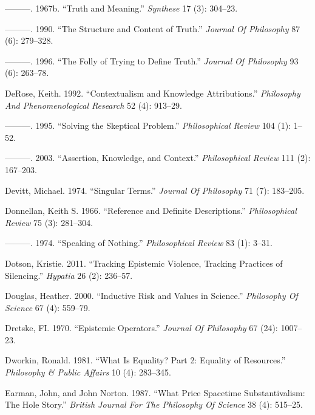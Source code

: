 \documentclass[
  10pt,
  letterpaper,
  DIV=11,
  numbers=noendperiod,
  twoside]{scrartcl}
\newlength{\cslhangindent}
\newenvironment{CSLReferences}[2] %
 {\begin{list}{}{%
  \setlength{\itemindent}{0pt}
  \setlength{\leftmargin}{0pt}
  \setlength{\parsep}{0pt}
  \ifodd #1
   \setlength{\leftmargin}{\cslhangindent}
   \setlength{\itemindent}{-1\cslhangindent}
  \fi
  \setlength{\itemsep}{#2\baselineskip}}}
 {\end{list}}
\begin{document}
\begin{CSLReferences}{1}{0}
---------. 1967b. {``Truth and Meaning.''} \emph{Synthese} 17 (3):
304--23.

---------. 1990. {``The Structure and Content of Truth.''} \emph{Journal
Of Philosophy} 87 (6): 279--328.

---------. 1996. {``The Folly of Trying to Define Truth.''}
\emph{Journal Of Philosophy} 93 (6): 263--78.

DeRose, Keith. 1992. {``Contextualism and Knowledge Attributions.''}
\emph{Philosophy And Phenomenological Research} 52 (4): 913--29.

---------. 1995. {``Solving the Skeptical Problem.''}
\emph{Philosophical Review} 104 (1): 1--52.

---------. 2003. {``Assertion, Knowledge, and Context.''}
\emph{Philosophical Review} 111 (2): 167--203.

Devitt, Michael. 1974. {``Singular Terms.''} \emph{Journal Of
Philosophy} 71 (7): 183--205.

Donnellan, Keith S. 1966. {``Reference and Definite Descriptions.''}
\emph{Philosophical Review} 75 (3): 281--304.

---------. 1974. {``Speaking of Nothing.''} \emph{Philosophical Review}
83 (1): 3--31.

Dotson, Kristie. 2011. {``Tracking Epistemic Violence, Tracking
Practices of Silencing.''} \emph{Hypatia} 26 (2): 236--57.

Douglas, Heather. 2000. {``Inductive Risk and Values in Science.''}
\emph{Philosophy Of Science} 67 (4): 559--79.

Dretske, FI. 1970. {``Epistemic Operators.''} \emph{Journal Of
Philosophy} 67 (24): 1007--23.

Dworkin, Ronald. 1981. {``What Is Equality? Part 2: Equality of
Resources.''} \emph{Philosophy \& Public Affairs} 10 (4): 283--345.

Earman, John, and John Norton. 1987. {``What Price Spacetime
Substantivalism: The Hole Story.''} \emph{British Journal For The
Philosophy Of Science} 38 (4): 515--25.


\end{CSLReferences}
\end{document}
